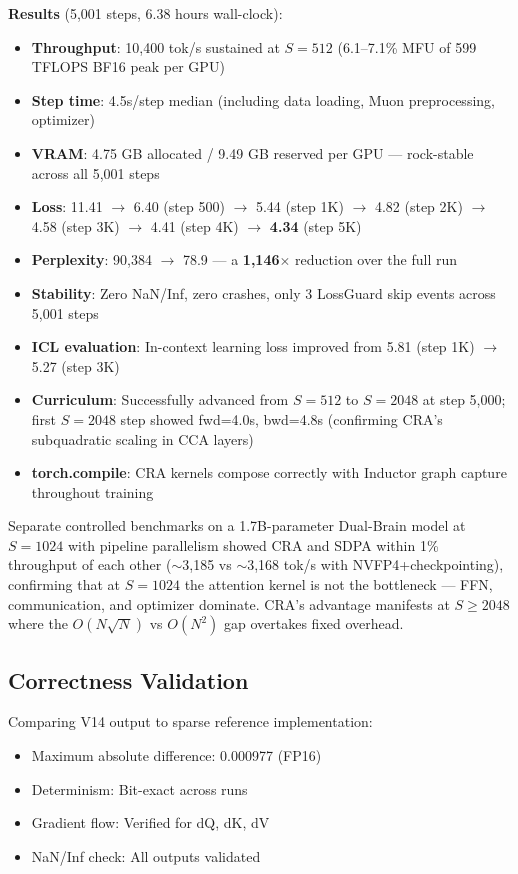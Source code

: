 \documentclass{article}
\begin{document}
    \textbf{Results} (5,001 steps, 6.38 hours wall-clock):
    \begin{itemize}
        \item \textbf{Throughput}: 10,400 tok/s sustained at $S{=}512$ (6.1--7.1\% MFU of 599 TFLOPS BF16 peak per GPU)
        \item \textbf{Step time}: 4.5s/step median (including data loading, Muon preprocessing, optimizer)
        \item \textbf{VRAM}: 4.75 GB allocated / 9.49 GB reserved per GPU --- rock-stable across all 5,001 steps
        \item \textbf{Loss}: 11.41 $\to$ 6.40 (step 500) $\to$ 5.44 (step 1K) $\to$ 4.82 (step 2K) $\to$ 4.58 (step 3K) $\to$ 4.41 (step 4K) $\to$ \textbf{4.34} (step 5K)
        \item \textbf{Perplexity}: 90,384 $\to$ 78.9 --- a \textbf{1,146$\times$} reduction over the full run
        \item \textbf{Stability}: Zero NaN/Inf, zero crashes, only 3 LossGuard skip events across 5,001 steps
        \item \textbf{ICL evaluation}: In-context learning loss improved from 5.81 (step 1K) $\to$ 5.27 (step 3K)
        \item \textbf{Curriculum}: Successfully advanced from $S{=}512$ to $S{=}2048$ at step 5,000; first $S{=}2048$ step showed fwd=4.0s, bwd=4.8s (confirming CRA's subquadratic scaling in CCA layers)
        \item \textbf{torch.compile}: CRA kernels compose correctly with Inductor graph capture throughout training
    \end{itemize}

    Separate controlled benchmarks on a 1.7B-parameter Dual-Brain model at $S=1024$ with pipeline parallelism showed CRA and SDPA within 1\% throughput of each other ($\sim$3,185 vs $\sim$3,168 tok/s with NVFP4+checkpointing), confirming that at $S=1024$ the attention kernel is not the bottleneck --- FFN, communication, and optimizer dominate. CRA's advantage manifests at $S \geq 2048$ where the $O(N\sqrt{N})$ vs $O(N^2)$ gap overtakes fixed overhead.

    \subsection{Correctness Validation}

    Comparing V14 output to sparse reference implementation:
    \begin{itemize}
        \item Maximum absolute difference: 0.000977 (FP16)
        \item Determinism: Bit-exact across runs
        \item Gradient flow: Verified for dQ, dK, dV
        \item NaN/Inf check: All outputs validated
    \end{itemize}
\end{document}
